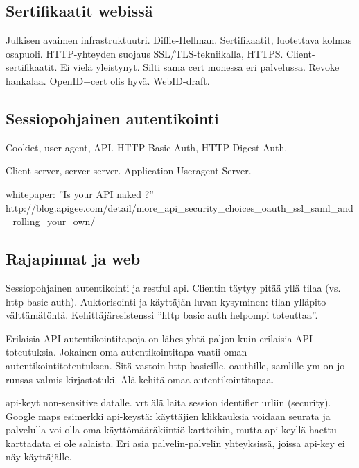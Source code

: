 \documentclass[english,gradu]{tktltiki}
\begin{document}



  \subsection{Sertifikaatit webissä} %
  \label{sub:sertifikaatit_webissä}
  Julkisen avaimen infrastruktuutri.
  Diffie-Hellman.
  Sertifikaatit, luotettava kolmas osapuoli.
  HTTP-yhteyden suojaus SSL/TLS-tekniikalla, HTTPS.
  Client-sertifikaatit. Ei vielä yleistynyt. Silti sama cert monessa eri palvelussa. Revoke hankalaa. OpenID+cert olis hyvä.
  WebID-draft.


  \subsection{Sessiopohjainen autentikointi} %
  \label{sub:sessiopohjainen_autentikointi}
  Cookiet, user-agent, API. HTTP Basic Auth, HTTP Digest Auth.

  Client-server, server-server. Application-Useragent-Server.

  whitepaper: ''Is your API naked ?''
  http://blog.apigee.com/detail/more_api_security_choices_oauth_ssl_saml_and_rolling_your_own/

  \subsection{Rajapinnat ja web} %
  \label{sub:rajapinnat_ja_web}

  Sessiopohjainen autentikointi ja restful api. Clientin täytyy pitää yllä tilaa (vs. http basic auth).
  Auktorisointi ja käyttäjän luvan kysyminen: tilan ylläpito välttämätöntä. Kehittäjäresistenssi ''http basic auth helpompi toteuttaa''.

  Erilaisia API-autentikointitapoja on lähes yhtä paljon kuin erilaisia API-toteutuksia. Jokainen oma autentikointitapa vaatii oman autentikointitoteutuksen. Sitä vastoin http basicille, oauthille, samlille ym on jo runsas valmis kirjastotuki.  Älä kehitä omaa autentikointitapaa.

  api-keyt non-sensitive datalle. vrt älä laita session identifier urliin (security). Google maps esimerkki api-keystä: käyttäjien klikkauksia voidaan seurata ja palvelulla voi olla oma käyttömääräkiintiö karttoihin, mutta api-keyllä haettu karttadata ei ole salaista. Eri asia palvelin-palvelin yhteyksissä, joissa api-key ei näy käyttäjälle.
\end{document}
